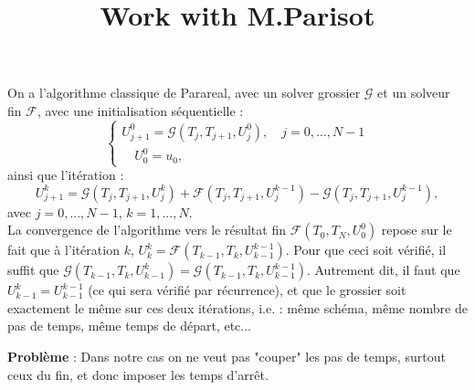 \documentclass[review,onefignum,onetabnum]{siamart220329}
\title{Work with M.Parisot}
\newcommand{\G}{\mathcal{G}}
\newcommand{\F}{\mathcal{F}}
\begin{document}
\maketitle

\noindent On a l'algorithme classique de Parareal, avec un solver grossier $\G$ et un solveur fin $\F$, avec une initialisation séquentielle :
\begin{equation}
\begin{cases}
    U^{0}_{j+1} = \G(T_{j},T_{j+1},U^{0}_{j}), \quad j = 0,\ldots,N-1\\
    \quad U^{0}_{0} = u_0,
\end{cases}
\end{equation}
ainsi que l'itération :
\begin{equation}
    U^{k}_{j+1} = \G(T_{j},T_{j+1},U^{k}_{j}) + \mathcal{F}(T_{j},T_{j+1},U^{k-1}_{j}) - \G(T_{j},T_{j+1},U^{k-1}_{j}),
\end{equation}
avec $j = 0,...,N-1$, $k = 1,...,N$.\\
La convergence de l'algorithme vers le résultat fin $\F(T_0,T_N,U^0_0)$ repose sur le fait que à l'itération $k$, $U^k_k = \F(T_{k-1},T_{k},U^{k-1}_{k-1})$. Pour que ceci soit vérifié, il suffit que $\G(T_{k-1},T_{k},U^{k}_{k-1}) = \G(T_{k-1},T_{k},U^{k-1}_{k-1})$. Autrement dit, il faut que $U^{k}_{k-1} = U^{k-1}_{k-1}$ (ce qui sera vérifié par récurrence), et que le grossier soit exactement le même sur ces deux itérations, i.e. : même schéma, même nombre de pas de temps, même temps de départ, etc...
\begin{boxA}
\textbf{Problème} : Dans notre cas on ne veut pas "couper" les pas de temps, surtout ceux du fin, et donc imposer les temps d'arrêt.   
\end{boxA}
\end{document}
